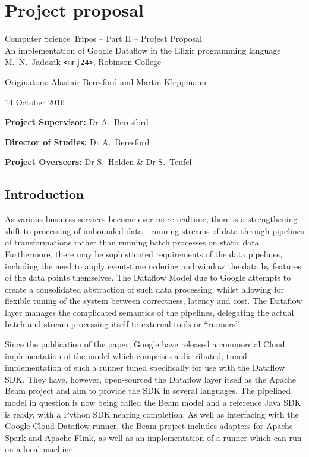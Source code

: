 \chapter{Project proposal}

\begin{center}
\Large
Computer Science Tripos -- Part II -- Project Proposal\\[4mm]
\LARGE
An implementation of Google Dataflow in the Elixir programming language\\[4mm]

\large
M.~N.~Jadczak \texttt{<mnj24>}, Robinson College

Originators: Alastair Beresford and Martin Kleppmann

14 October 2016
\end{center}

\vspace{5mm}

\textbf{Project Supervisor:} Dr A.~Beresford

\textbf{Director of Studies:} Dr A.~Beresford

\textbf{Project Overseers:} Dr S.~Holden  \& Dr S.~Teufel


\section*{Introduction}

As various business services become ever more realtime, there is a strengthening shift to processing of unbounded data---running streams of data through pipelines of transformations rather than running batch processes on static data. Furthermore, there may be sophisticated requirements of the data pipelines, including the need to apply event-time ordering and window the data by features of the data points themselves. The Dataflow Model due to Google \cite{Akidau:2015} attempts to create a consolidated abstraction of such data processing, whilst allowing for flexible tuning of the system between correctness, latency and cost. The Dataflow layer manages the complicated semantics of the pipelines, delegating the actual batch and stream processing itself to external tools or ``runners''.

Since the publication of the paper, Google have released a commercial Cloud implementation of the model \cite{CloudDataflow} which comprises a distributed, tuned implementation of such a runner tuned specifically for use with the Dataflow SDK. They have, however, open-sourced the Dataflow layer itself as the Apache Beam project \cite{ApacheBeam} and aim to provide the SDK in several languages. The pipelined model in question is now being called the Beam model and a reference Java SDK is ready, with a Python SDK nearing completion. As well as interfacing with the Google Cloud Dataflow runner, the Beam project includes adapters for Apache Spark and Apache Flink, as well as an implementation of a runner which can run on a local machine.

